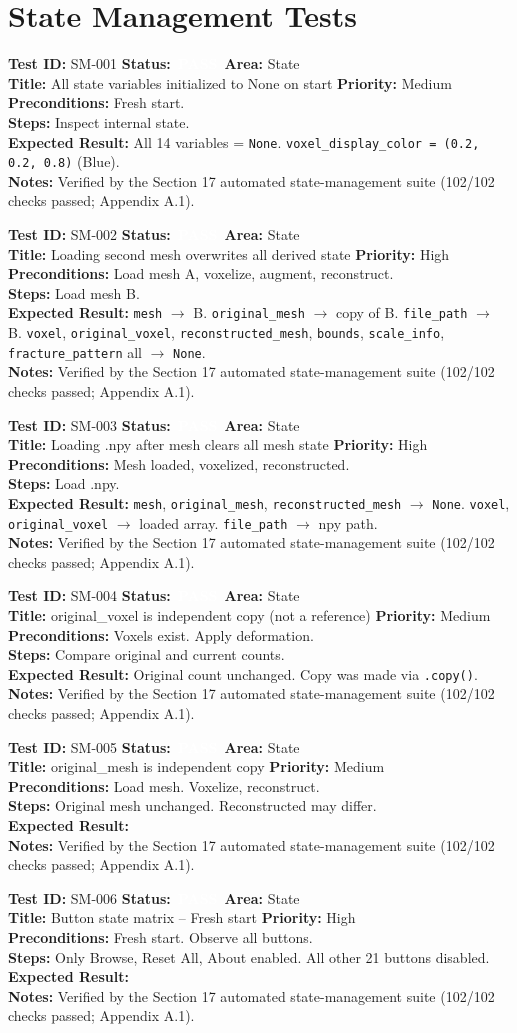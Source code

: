 \documentclass[12pt,a4paper]{article}
\newcommand{\statuspass}{\colorbox{statusgreen}{\textcolor{white}{\textbf{\,PASS\,}}}}
\newcommand{\testcase}[9]{%
  \smallskip
  \noindent\textbf{Test ID:} #1 \hfill \textbf{Status:} #2 \hfill \textbf{Area:} #3 \\
  \textbf{Title:} #4 \hfill \textbf{Priority:} #5 \\[0.3em]
  \textbf{Preconditions:} #6 \\[0.3em]
  \textbf{Steps:} #7 \\[0.3em]
  \textbf{Expected Result:} #8 \\
  \textbf{Notes:} #9
  \smallskip
}
\begin{document}
\section{State Management Tests}

\testcase{SM-001}{\statuspass}{State}{All state variables initialized to None on start}{Medium}{Fresh start.}{Inspect internal state.}{All 14 variables = \texttt{None}. \texttt{voxel\_display\_color = (0.2, 0.2, 0.8)} (Blue).}{Verified by the Section 17 automated state-management suite (102/102 checks passed; Appendix A.1).}


\testcase{SM-002}{\statuspass}{State}{Loading second mesh overwrites all derived state}{High}{Load mesh A, voxelize, augment, reconstruct.}{Load mesh B.}{\texttt{mesh} $\rightarrow$ B. \texttt{original\_mesh} $\rightarrow$ copy of B. \texttt{file\_path} $\rightarrow$ B. \texttt{voxel}, \texttt{original\_voxel}, \texttt{reconstructed\_mesh}, \texttt{bounds}, \texttt{scale\_info}, \texttt{fracture\_pattern} all $\rightarrow$ \texttt{None}.}{Verified by the Section 17 automated state-management suite (102/102 checks passed; Appendix A.1).}


\testcase{SM-003}{\statuspass}{State}{Loading .npy after mesh clears all mesh state}{High}{Mesh loaded, voxelized, reconstructed.}{Load .npy.}{\texttt{mesh}, \texttt{original\_mesh}, \texttt{reconstructed\_mesh} $\rightarrow$ \texttt{None}. \texttt{voxel}, \texttt{original\_voxel} $\rightarrow$ loaded array. \texttt{file\_path} $\rightarrow$ npy path.}{Verified by the Section 17 automated state-management suite (102/102 checks passed; Appendix A.1).}


\testcase{SM-004}{\statuspass}{State}{original\_voxel is independent copy (not a reference)}{Medium}{Voxels exist. Apply deformation.}{Compare original and current counts.}{Original count unchanged. Copy was made via \texttt{.copy()}.}{Verified by the Section 17 automated state-management suite (102/102 checks passed; Appendix A.1).}


\testcase{SM-005}{\statuspass}{State}{original\_mesh is independent copy}{Medium}{Load mesh. Voxelize, reconstruct.}{Original mesh unchanged. Reconstructed may differ.}{}{Verified by the Section 17 automated state-management suite (102/102 checks passed; Appendix A.1).}


\testcase{SM-006}{\statuspass}{State}{Button state matrix -- Fresh start}{High}{Fresh start. Observe all buttons.}{Only Browse, Reset All, About enabled. All other 21 buttons disabled.}{}{Verified by the Section 17 automated state-management suite (102/102 checks passed; Appendix A.1).}
\end{document}
